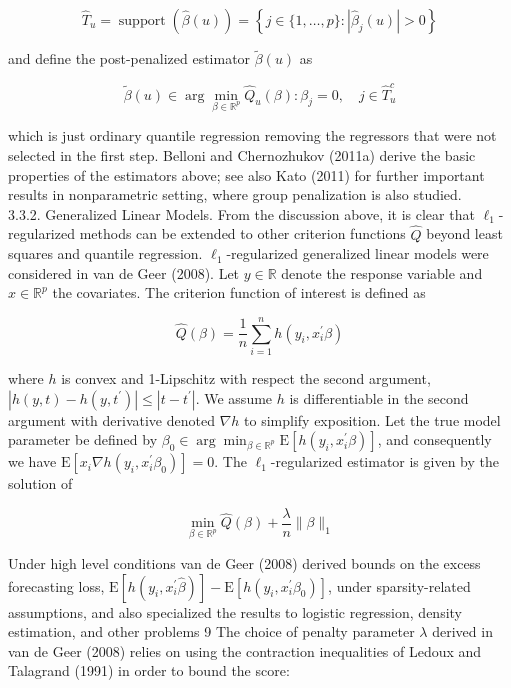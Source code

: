 \documentclass[10pt]{article}
\begin{document}
\[
\widehat{T}_{u}=\operatorname{support}(\widehat{\beta}(u))=\left\{j \in\{1, \ldots, p\}:\left|\widehat{\beta}_{j}(u)\right|>0\right\}
\]

and define the post-penalized estimator \(\widetilde{\beta}(u)\) as

\[
\widetilde{\beta}(u) \in \arg \min _{\beta \in \mathbb{R}^{p}} \widehat{Q}_{u}(\beta): \beta_{j}=0, \quad j \in \widehat{T}_{u}^{c}
\]

which is just ordinary quantile regression removing the regressors that were not selected in the first step. Belloni and Chernozhukov (2011a) derive the basic properties of the estimators above; see also Kato (2011) for further important results in nonparametric setting, where group penalization is also studied.\\
3.3.2. Generalized Linear Models. From the discussion above, it is clear that \(\ell_{1}\)-regularized methods can be extended to other criterion functions \(\widehat{Q}\) beyond least squares and quantile regression. \(\ell_{1}\)-regularized generalized linear models were considered in van de Geer (2008). Let \(y \in \mathbb{R}\) denote the response variable and \(x \in \mathbb{R}^{p}\) the covariates. The criterion function of interest is defined as

\[
\widehat{Q}(\beta)=\frac{1}{n} \sum_{i=1}^{n} h\left(y_{i}, x_{i}^{\prime} \beta\right)
\]

where \(h\) is convex and 1-Lipschitz with respect the second argument, \(\left|h(y, t)-h\left(y, t^{\prime}\right)\right| \leqslant\left|t-t^{\prime}\right|\). We assume \(h\) is differentiable in the second argument with derivative denoted \(\nabla h\) to simplify exposition. Let the true model parameter be defined by \(\beta_{0} \in \arg \min _{\beta \in \mathbb{R}^{p}} \mathrm{E}\left[h\left(y_{i}, x_{i}^{\prime} \beta\right)\right]\), and consequently we have \(\mathrm{E}\left[x_{i} \nabla h\left(y_{i}, x_{i}^{\prime} \beta_{0}\right)\right]=0\). The \(\ell_{1}\)-regularized estimator is given by the solution of

\[
\min _{\beta \in \mathbb{R}^{p}} \widehat{Q}(\beta)+\frac{\lambda}{n}\|\beta\|_{1}
\]

Under high level conditions van de Geer (2008) derived bounds on the excess forecasting loss, \(\mathrm{E}\left[h\left(y_{i}, x_{i}^{\prime} \widehat{\beta}\right)\right]-\mathrm{E}\left[h\left(y_{i}, x_{i}^{\prime} \beta_{0}\right)\right]\), under sparsity-related assumptions, and also specialized the results to logistic regression, density estimation, and other problems 9 The choice of penalty parameter \(\lambda\) derived in van de Geer (2008) relies on using the contraction inequalities of Ledoux and Talagrand (1991) in order to bound the score:
\end{document}
